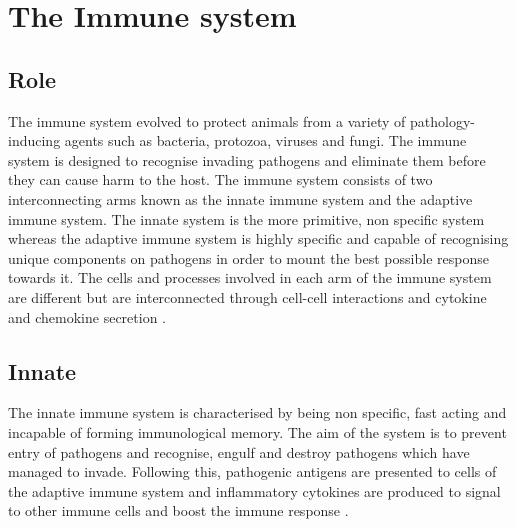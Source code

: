 





\section{The Immune system}
\subsection{Role}

The immune system evolved to protect animals from a variety of pathology-inducing agents such as bacteria, protozoa, viruses and fungi.
The immune system is designed to recognise invading pathogens and eliminate them before they can cause harm to the host.
The immune system consists of two interconnecting arms known as the innate immune system and the adaptive immune system.
The innate system is the more primitive, non specific system whereas the adaptive immune system is highly specific and capable of recognising unique components on pathogens in order to mount the best possible response towards it.
The cells and processes involved in each arm of the immune system are different but are interconnected through cell-cell interactions and cytokine and chemokine secretion \citep{KubyImmunology, Janeway2001, Parkin2001}.

\subsection{Innate}

The innate immune system is characterised by being non specific, fast acting and incapable of forming immunological memory.
The aim of the system is to prevent entry of pathogens and recognise, engulf and destroy pathogens which have managed to invade.
Following this, pathogenic antigens are presented to cells of the adaptive immune system and inflammatory cytokines are produced to signal to other immune cells and boost the immune response \citep{Janeway2001}.

